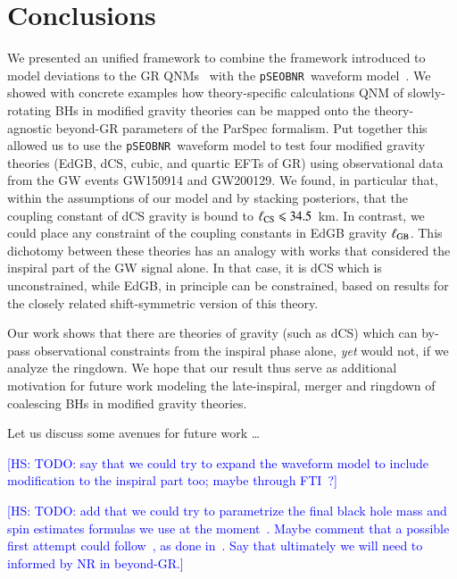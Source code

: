 \documentclass[twocolumn,
               prd,
               aps,
               superscriptaddress,
               tightenlines,
               nofootinbib,
               eqsecnum,
               amsfonts,
               amsmath,
               longbibliography]{revtex4-1}
\newcommand{\pSEOB}{\texttt{pSEOBNR}}
\newcommand{\hs}[1]{{\textcolor{blue}{{[HS: #1]}} }}
\begin{document}
\section{Conclusions}
\label{sec:conclusions}


We presented an unified framework to combine the framework introduced
to model deviations to the GR QNMs~\cite{Maselli:2019mjd} with the \pSEOB~waveform model~\cite{Brito:2018rfr,Ghosh:2021mrv}.
%
We showed with concrete examples how theory-specific calculations QNM of
slowly-rotating BHs in modified gravity theories can be mapped onto the
theory-agnostic beyond-GR parameters of the ParSpec formalism.
%
Put together this allowed us to use the \pSEOB~waveform model to test four
modified gravity theories (EdGB, dCS, cubic, and quartic EFTs of GR) using
observational data from the GW events GW150914 and GW200129.
%
We found, in particular that, within the assumptions of our model and by
stacking posteriors, that the coupling constant of dCS gravity is bound to
$\ell_{\rm CS} \leqslant 34.5$~km.
%
In contrast, we could place any constraint of the coupling constants in EdGB gravity $\ell_{\rm GB}$.
%
This dichotomy between these theories has an analogy with works that considered
the inspiral part of the GW signal alone.
%
In that case, it is dCS which is unconstrained, while EdGB, in principle can be
constrained, based on results for the closely related shift-symmetric version
of this theory.

Our work shows that there are theories of gravity (such as dCS) which can by-pass observational
constraints from the inspiral phase alone, {\it yet} would not, if we
analyze the ringdown.
%
We hope that our result thus serve as additional motivation for future work
modeling the late-inspiral, merger and ringdown of coalescing BHs in modified
gravity theories.

Let us discuss some avenues for future work \dots

\hs{TODO: say that we could try to expand the waveform model to include modification to
the inspiral part too; maybe through FTI~\cite{Mehta:2022pcn}?}

\hs{TODO: add that we could try to parametrize the final black hole mass and spin estimates formulas we
use at the moment~\cite{Hofmann:2016yih}. Maybe comment that a possible first attempt could follow~\cite{Buonanno:2007sv},
as done in~\cite{Jai-akson:2017ldo,Li:2020wse}. Say that ultimately we will need to informed by NR in beyond-GR.}
\end{document}
